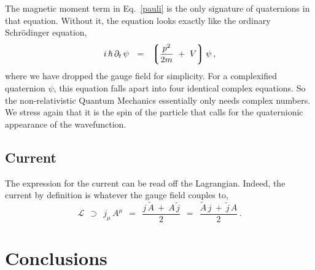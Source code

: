 \documentclass[epsfig,12pt]{article}
\newcommand{\cell}{{\mathcal L}}
\newcommand{\p}{\partial}
\newcommand{\wt}{\widetilde}
\newcommand{\lgr}{\left\lgroup}
\newcommand{\rgr}{\right\rgroup}
\begin{document}
	The magnetic moment term in Eq.~\eqref{pauli} is the only signature of quaternions
	in that equation.
	Without it, the equation looks exactly like the ordinary Schr\"odinger equation,
\begin{equation}
\label{simple-schrod}
	i\,\hbar\,\p_t\,\psi	~~=~~
		\lgr
			\frac {p^2} {2m}
			~+~  V
		\rgr \psi\,,
\end{equation}
	where we have dropped the gauge field for simplicity.
	For a complexified quaternion $ \psi $, this equation falls apart into four
	identical complex equations.
	So the non-relativistic Quantum Mechanics essentially only needs complex numbers.
	We stress again that it is the spin of the particle that calls for the
	quaternionic appearance of the wavefunction.
	

\subsection{Current}

	The expression for the current can be read off the Lagrangian.
	Indeed, the current by definition is whatever the gauge field couples to,
\begin{equation}
	\cell	~~\supset~~	j_\mu\, A^\mu	
		~~=~~	\frac{j\,\wt A ~+~ A\,\wt j } 2
		~~=~~	\frac{\wt A\, j  ~+~  \wt j\, A} 2\,.
\end{equation}



\pagebreak
\section{Conclusions}
\end{document}
